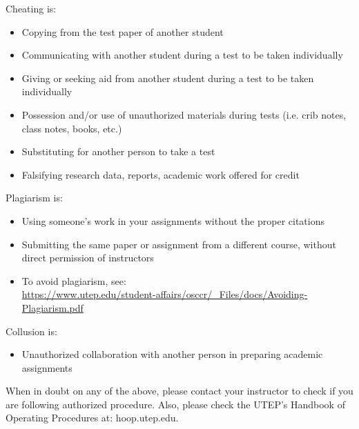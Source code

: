 \documentclass[12pt]{scrartcl}
\begin{document}
Cheating is:
\begin{itemize}
\item Copying from the test paper of another student
\item Communicating with another student during a test to be taken individually
\item Giving or seeking aid from another student during a test to be taken individually
\item Possession and/or use of unauthorized materials during tests (i.e. crib notes, class notes, books, etc.)
\item Substituting for another person to take a test
\item Falsifying research data, reports, academic work offered for credit
\end{itemize}

Plagiarism is:
\begin{itemize}
\item Using someone’s work in your assignments without the proper citations
\item Submitting the same paper or assignment from a different course, without direct permission of instructors
\item[]\vspace{1em} To avoid plagiarism, see: \\{\footnotesize\url{https://www.utep.edu/student-affairs/osccr/_Files/docs/Avoiding-Plagiarism.pdf}}
\end{itemize}
                               
Collusion is:
\begin{itemize}
\item Unauthorized collaboration with another person in preparing academic assignments
\end{itemize}

\begin{tcolorbox}[colback=red!5,colframe=red!75!black,title=Important!]
When in doubt on any of the above, please contact your instructor to check if you are following authorized procedure. Also, please check the UTEP’s Handbook of Operating Procedures at: hoop.utep.edu. 
\end{tcolorbox}

\end{document}
